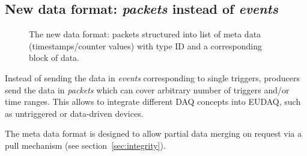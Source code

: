 \documentclass[paper=a4, fontsize=11pt]{scrartcl}	%
\numberwithin{equation}{section}		%
\numberwithin{figure}{section}			%
\numberwithin{table}{section}				%
\begin{document}
\subsection{New data format: \emph{packets} instead of \emph{events}}
\label{sec:event}

\begin{figure}[htbp]
  \centering
  
  \caption{The new data format: packets structured into list of meta
    data (timestamps/counter values) with type ID and a corresponding
    block of data.}
\label{fig:packetformat}
\end{figure}

Instead of sending the data in \emph{events} corresponding to single
triggers, producers send the data in \emph{packets} which can cover
arbitrary number of triggers and/or time ranges. This allows to
integrate different DAQ concepts into EUDAQ, such as untriggered or
data-driven devices.

The meta data format is designed to allow partial data merging on
request via a pull mechanism (see section~\ref{sec:integrity}).
\end{document}
